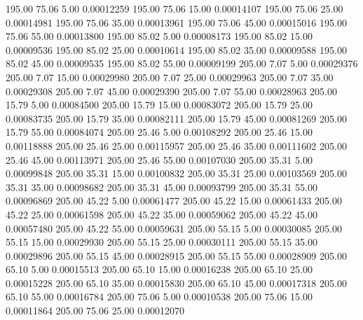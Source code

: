     195.00     75.06      5.00     0.00012259
    195.00     75.06     15.00     0.00014107
    195.00     75.06     25.00     0.00014981
    195.00     75.06     35.00     0.00013961
    195.00     75.06     45.00     0.00015016
    195.00     75.06     55.00     0.00013800
    195.00     85.02      5.00     0.00008173
    195.00     85.02     15.00     0.00009536
    195.00     85.02     25.00     0.00010614
    195.00     85.02     35.00     0.00009588
    195.00     85.02     45.00     0.00009535
    195.00     85.02     55.00     0.00009199
    205.00      7.07      5.00     0.00029376
    205.00      7.07     15.00     0.00029980
    205.00      7.07     25.00     0.00029963
    205.00      7.07     35.00     0.00029308
    205.00      7.07     45.00     0.00029390
    205.00      7.07     55.00     0.00028963
    205.00     15.79      5.00     0.00084500
    205.00     15.79     15.00     0.00083072
    205.00     15.79     25.00     0.00083735
    205.00     15.79     35.00     0.00082111
    205.00     15.79     45.00     0.00081269
    205.00     15.79     55.00     0.00084074
    205.00     25.46      5.00     0.00108292
    205.00     25.46     15.00     0.00118888
    205.00     25.46     25.00     0.00115957
    205.00     25.46     35.00     0.00111602
    205.00     25.46     45.00     0.00113971
    205.00     25.46     55.00     0.00107030
    205.00     35.31      5.00     0.00099848
    205.00     35.31     15.00     0.00100832
    205.00     35.31     25.00     0.00103569
    205.00     35.31     35.00     0.00098682
    205.00     35.31     45.00     0.00093799
    205.00     35.31     55.00     0.00096869
    205.00     45.22      5.00     0.00061477
    205.00     45.22     15.00     0.00061433
    205.00     45.22     25.00     0.00061598
    205.00     45.22     35.00     0.00059062
    205.00     45.22     45.00     0.00057480
    205.00     45.22     55.00     0.00059631
    205.00     55.15      5.00     0.00030085
    205.00     55.15     15.00     0.00029930
    205.00     55.15     25.00     0.00030111
    205.00     55.15     35.00     0.00029896
    205.00     55.15     45.00     0.00028915
    205.00     55.15     55.00     0.00028909
    205.00     65.10      5.00     0.00015513
    205.00     65.10     15.00     0.00016238
    205.00     65.10     25.00     0.00015228
    205.00     65.10     35.00     0.00015830
    205.00     65.10     45.00     0.00017318
    205.00     65.10     55.00     0.00016784
    205.00     75.06      5.00     0.00010538
    205.00     75.06     15.00     0.00011864
    205.00     75.06     25.00     0.00012070
